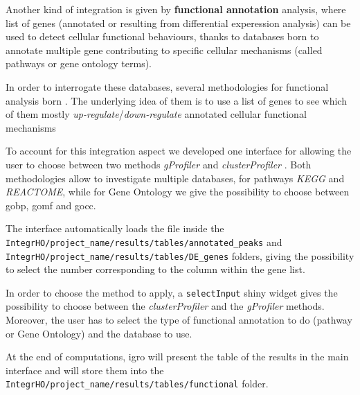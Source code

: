 Another kind of integration is given by \textbf{functional annotation} analysis, where list of genes (annotated or resulting from differential experession analysis) can be used to detect cellular functional behaviours, thanks to databases born to annotate multiple gene contributing to specific cellular mechanisms (called pathways or gene ontology terms).

In order to interrogate these databases, several methodologies for functional analysis born \cite{Subramanian2005, Sales2012a, Reimand2016, Yu2012, Huang2009}.
The underlying idea of them is to use a list of genes to see which of them mostly \textit{up-regulate}/\textit{down-regulate} annotated cellular functional mechanisms

To account for this integration aspect we developed one interface for allowing the user to choose between two methods \textit{gProfiler} \cite{Reimand2016} and \textit{clusterProfiler} \cite{Yu2012}.
Both methodologies allow to investigate multiple databases, for pathways \textit{KEGG} and \textit{REACTOME}, while for Gene Ontology we give the possibility to choose between \gls{gobp}, \gls{gomf} and \gls{gocc}.

The interface automatically loads the file inside the \lstinline!IntegrHO/project_name/results/tables/annotated_peaks! and \lstinline!IntegrHO/project_name/results/tables/DE_genes! folders, giving the possibility to select the number corresponding to the column within the gene list.

In order to choose the method to apply, a \lstinline!selectInput! shiny widget gives the possibility to choose between the \textit{clusterProfiler} and the \textit{gProfiler} methods.
Moreover, the user has to select the type of functional annotation to do (pathway or Gene Ontology) and the database to use.

At the end of computations, \gls{igro} will present the table of the results in the main interface and will store them into the  \lstinline!IntegrHO/project_name/results/tables/functional! folder.

